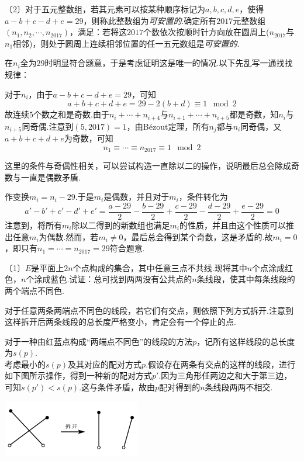 \documentclass[lang=cn, zihao=4.5]{elegantbook}
\newcommand{\nd}[1]{〔#1〕}
\begin{document}
\begin{example} %
	\nd{2}对于五元整数组，若其元素可以按某种顺序标记为$a,b,c,d,e$，使得$a-b+c-d+e=29$，则称此整数组为\textit{可安置的}.确定所有$2017$元整数组$(n_1,n_2, \cdots ,n_{2017})$，满足：若将这$2017$个数依次按顺时针方向放在圆周上($n_{2017}$与$n_1$相邻)，则处于圆周上连续相邻位置的任一五元数组是\textit{可安置的}.
\end{example}
\begin{solution}
	\begin{guess}
		在$n_i$全为$29$时明显符合题意，于是考虑证明这是唯一的情况.以下先乱写一通找找规律：
	\end{guess}
	对于$n_i$，由于$a-b+c-d+e=29$，可知$$a+b+c+d+e=29-2(b+d) \equiv 1\mod 2$$
	故连续$5$个数之和是奇数.由于$n_i+ \cdots + n_{i+4}$与$n_{i+1} + \cdots + n_{i+5}$都是奇数，知$n_i$与$n_{i+5}$同奇偶.注意到$(5,2017)=1$，由Bézout定理，所有$n_j$都与$n_i$同奇偶，又$a+b+c+d+e$为奇数，可知$$n_1 \equiv \cdots \equiv n_{2017} \equiv 1 \mod 2$$
	\begin{guess}
		这里的条件与奇偶性相关，可以尝试构造一直除以二的操作，说明最后总会除成奇数与一直是偶数矛盾.
	\end{guess}
	作变换$m_i=n_i-29$.于是$m_i$是偶数，并且对于$m_i$，条件转化为$$a' - b' + c' - d' + e' = \frac{a-29}{2} - \frac{b-29}{2} + \frac{c-29}{2} - \frac{d-29}{2} + \frac{e-29}{2} = 0$$
	注意到，将所有$m_i$除以二得到的新数组也满足$m_i$的性质，并且由这个性质可以推出任意$m_i$为偶数.然而，若$m_i \neq 0$，最后总会得到某个奇数，这是矛盾的.故$m_i=0$，即只有$n_1 = \cdots = n_{2017}=29$符合题意.
\end{solution}

\begin{example} %
	\nd{1}$E$是平面上$2n$个点构成的集合，其中任意三点不共线.现将其中$n$个点涂成红色，$n$个涂成蓝色.试证：总可找到两两没有公共点的$n$条线段，使其中每条线段的两个端点不同色.
\end{example}
\begin{solution}
	\begin{guess}
		对于任意两条两端点不同色的线段，若它们有交点，则依照下列方式拆开.注意到这样拆开后两条线段的总长度严格变小，肯定会有一个停止的点.
	\end{guess}
	对于一种由红蓝点构成“两端点不同色”的线段的方法$p$，记所有这样线段的总长度为$s(p)$. \\
	考虑最小的$s(p)$及其对应的配对方式$p$.假设存在两条有交点的这样的线段，进行如下图所示操作，得到一种新的配对方式$p'$.因为三角形任两边之和大于第三边，可知$s(p')<s(p)$.这与条件矛盾，故由$p$配对得到的$n$条线段两两不相交.
	\begin{center}
		\includegraphics[width=6cm]{attachment/202302072.pdf}
	\end{center}
\end{solution}
\end{document}
